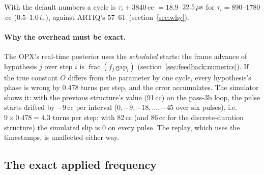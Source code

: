 With the default numbers a cycle is $\tau_i + 3840$\,cc $= 18.9$--$22.5\,\mu\mathrm{s}$
for $\tau_i = 890$--$1780$\,cc ($0.5$--$1.0\,t_\pi$), against ARTIQ's
57--61\us\ (section~\ref{sec:why}).

\paragraph{Why the overhead must be exact.} The OPX's real-time posterior
uses the \emph{scheduled} starts: the frame advance of hypothesis $j$ over
step $i$ is $\operatorname{frac}(f_j\,\mathrm{gap}_i)$
(section~\ref{sec:feedback:numerics}). If the true constant $O$ differs from
the parameter by one cycle, every hypothesis's phase is wrong by 0.478 turns
per step, and the error accumulates. The simulator shows it: with the
previous structure's value (91\,cc) on the pass-3b loop, the pulse starts
drifted by $-9$\,cc per interval ($0, -9, -18, \dots, -45$ over six pulses),
i.e.\ $9 \times 0.478 = 4.3$ turns per step; with 82\,cc (and 86\,cc for the
discrete-duration structure) the simulated slip is 0 on every pulse. The
replay, which uses the timestamps, is unaffected either way.

\subsection{The exact applied frequency}
\label{sec:feedback:freq}

